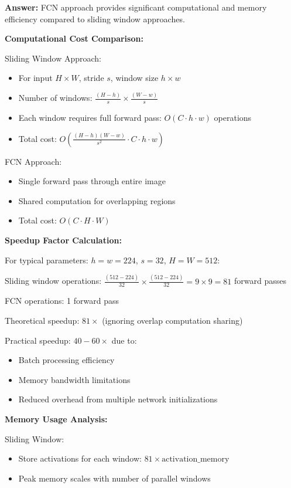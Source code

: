 \documentclass[12pt]{article}
\newcommand{\answer}[1]{{\color{answercolor}\textbf{Answer:} #1}}
\newcommand{\explanation}[1]{{\color{explanationcolor}#1}}
\begin{document}
\begin{enumerate}[(a)]
    \answer{FCN approach provides significant computational and memory efficiency compared to sliding window approaches.}
    
    \explanation{
    \textbf{Computational Cost Comparison:}
    
    Sliding Window Approach:
    \begin{itemize}
        \item For input $H \times W$, stride $s$, window size $h \times w$
        \item Number of windows: $\frac{(H-h)}{s} \times \frac{(W-w)}{s}$
        \item Each window requires full forward pass: $O(C \cdot h \cdot w)$ operations
        \item Total cost: $O\left(\frac{(H-h)(W-w)}{s^2} \cdot C \cdot h \cdot w\right)$
    \end{itemize}
    
    FCN Approach:
    \begin{itemize}
        \item Single forward pass through entire image
        \item Shared computation for overlapping regions
        \item Total cost: $O(C \cdot H \cdot W)$
    \end{itemize}
    
    \textbf{Speedup Factor Calculation:}
    
    For typical parameters: $h = w = 224$, $s = 32$, $H = W = 512$:
    
    Sliding window operations: $\frac{(512-224)}{32} \times \frac{(512-224)}{32} = 9 \times 9 = 81$ forward passes
    
    FCN operations: 1 forward pass
    
    Theoretical speedup: $81\times$ (ignoring overlap computation sharing)
    
    Practical speedup: $40-60\times$ due to:
    \begin{itemize}
        \item Batch processing efficiency
        \item Memory bandwidth limitations
        \item Reduced overhead from multiple network initializations
    \end{itemize}
    
    \textbf{Memory Usage Analysis:}
    
    Sliding Window:
    \begin{itemize}
        \item Store activations for each window: $81 \times \text{activation\_memory}$
        \item Peak memory scales with number of parallel windows
    \end{itemize}
    
}
\end{enumerate}
\end{document}
